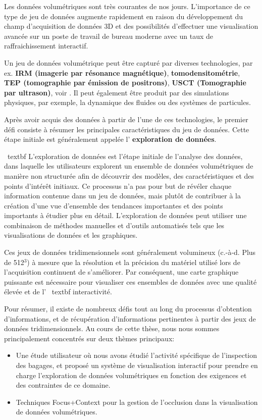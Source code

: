Les données volumétriques sont très courantes de nos jours. L'importance de ce type de jeu de données augmente rapidement en raison du développement du champ d'acquisition de données 3D et des possibilités d'effectuer une visualisation avancée sur un poste de travail de bureau moderne avec un taux de raffraichissement interactif.

Un jeu de données volumétrique peut être capturé par diverses technologies, par ex. \textbf {IRM (imagerie par résonance magnétique)}, \textbf {tomodensitométrie}, \textbf {TEP (tomographie par émission de positrons)}, \textbf {USCT (Tomographie par ultrason)}, voir \cite{radiology}. Il peut également être produit par des simulations physiques, par exemple, la dynamique des fluides ou des systèmes de particules.


Après avoir acquis des données à partir de l'une de ces technologies, le premier défi consiste à résumer les principales caractéristiques du jeu de données. Cette étape initiale est généralement appelée l' \textbf{exploration de données}.

\ textbf {L’exploration de données} est l’étape initiale de l’analyse des données, dans laquelle les utilisateurs explorent un ensemble de données volumétriques de manière non structurée afin de découvrir des modèles, des caractéristiques et des points d’intérêt initiaux. Ce processus n’a pas pour but de révéler chaque information contenue dans un jeu de données, mais plutôt de contribuer à la création d’une vue d’ensemble des tendances importantes et des points importants à étudier plus en détail. L'exploration de données peut utiliser une combinaison de méthodes manuelles et d'outils automatisés tels que les visualisations de données et les graphiques.


Ces jeux de données tridimensionnels sont généralement volumineux (c.-à-d. Plus de 512$^{3}$) à mesure que la résolution et la précision du matériel utilisé lors de l'acquisition continuent de s'améliorer. Par conséquent, une carte graphique puissante est nécessaire pour visualiser ces ensembles de données avec une qualité élevée et de l' \ textbf {interactivité}.

Pour résumer, il existe de nombreux défis tout au long du processus d'obtention d'informations, et de récupération d'informations pertinentes à partir des jeux de données tridimensionnels.
Au cours de cette thèse, nous nous sommes principalement concentrés sur deux thèmes principaux:

\begin{itemize}

\item Une étude utilisateur où nous avons étudié l'activité spécifique de l'inspection des bagages, et proposé un système de visualisation interactif pour prendre en charge l'exploration de données volumétriques en fonction des exigences et des contraintes de ce domaine.

\item Techniques Focus+Context pour la gestion de l'occlusion dans la visualisation de données volumétriques.
\end{itemize}

